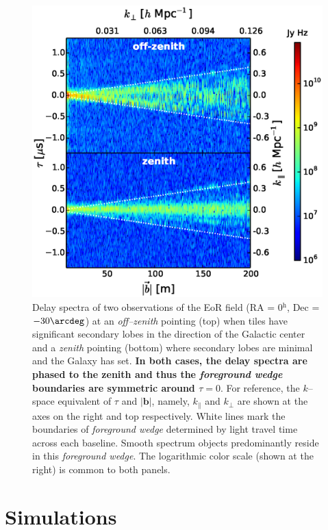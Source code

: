 \documentclass[preprint2,iop,numberedappendix]{emulateapj}
\begin{document}
\begin{figure}[htb]
\centering
\includegraphics[width=\linewidth]{f3.eps}
\caption{Delay spectra of two observations of the EoR field (RA = 0$^\textrm{h}$, Dec = $-30\arcdeg$) at an {\it off--zenith} pointing (top) when tiles have significant secondary lobes in the direction of the Galactic center and a {\it zenith} pointing (bottom) where secondary lobes are minimal and the Galaxy has set. {\bf In both cases, the delay spectra are phased to the zenith and thus the {\it foreground wedge} boundaries are symmetric around $\tau=0$}. For reference, the $k$--space equivalent of $\tau$ and $|\boldsymbol{b}|$, namely, $k_\parallel$ and $k_\perp$ are shown at the axes on the right and top respectively. White lines mark the boundaries of {\it foreground wedge} determined by light travel time across each baseline. Smooth spectrum objects predominantly reside in this {\it foreground wedge}. The logarithmic color scale (shown at the right) is common to both panels. \label{fig:fhd_data}}
\end{figure}

\section{Simulations}\label{sec:modeling}
\end{document}

